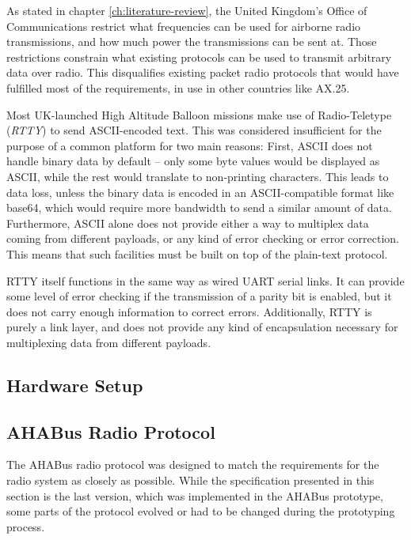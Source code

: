 As stated in chapter \ref{ch:literature-review}, the United Kingdom's Office
of Communications restrict what frequencies can be used for airborne
radio transmissions, and how much power the transmissions can be sent at.
Those restrictions constrain what existing protocols can be used to transmit
arbitrary data over radio. This disqualifies existing packet radio protocols
that would have fulfilled most of the requirements, in use in other countries
like AX.25.

Most UK-launched High Altitude Balloon missions make use of Radio-Teletype
(\textit{RTTY}) to send ASCII-encoded text. This was considered insufficient
for the purpose of a common platform for two main reasons: First, ASCII does
not handle binary data by default -- only some byte values would be displayed
as ASCII, while the rest would translate to non-printing characters. This leads
to data loss, unless the binary data is encoded in an ASCII-compatible format
like base64, which would require more bandwidth to send a similar amount of
data. Furthermore, ASCII alone does not provide either a way to multiplex data
coming from different payloads, or any kind of error checking or error
correction. This means that such facilities must be built on top of the
plain-text protocol.

RTTY itself functions in the same way as wired UART serial links. It can provide
some level of error checking if the transmission of a parity bit is enabled, but
it does not carry enough information to correct errors. Additionally, RTTY is
purely a link layer, and does not provide any kind of encapsulation necessary
for multiplexing data from different payloads.

\subsection{Hardware Setup}

\subsection{AHABus Radio Protocol}

The AHABus radio protocol was designed to match the requirements for the radio
system as closely as possible. While the specification presented in this section
is the last version, which was implemented in the AHABus prototype, some parts
of the protocol evolved or had to be changed during the prototyping process.

